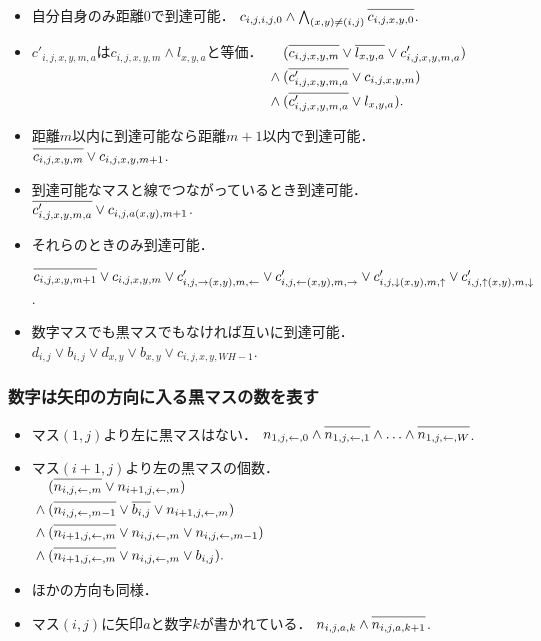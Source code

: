 \documentclass[a4j]{jarticle}
\newcommand{\N}[1]{\overline{#1\vphantom{l}}}
\newcommand{\←}{{\leftarrow}}
\newcommand{\→}{{\rightarrow}}
\newcommand{\↑}{{\uparrow}}
\newcommand{\↓}{{\downarrow}}
\begin{document}
\begin{itemize}
\item 自分自身のみ距離0で到達可能．
  $c_{i,j,i,j,0}\land \bigwedge_{(x,y)\ne(i,j)} \N{c_{i,j,x,y,0}}$.

\item $c'_{i,j,x,y,m,a}$は$c_{i,j,x,y,m}\land l_{x,y,a}$と等価．
  \quad
  $\begin{aligned}[t]
   &(\N{c_{i,j,x,y,m}}\lor\N{l_{x,y,a}}\lor{c'_{i,j,x,y,m,a}})\\{}\land{}
   &(\N{c'_{i,j,x,y,m,a}}\lor{c_{i,j,x,y,m}})\\{}\land{}
   &(\N{c'_{i,j,x,y,m,a}}\lor{l_{x,y,a}}).
   \end{aligned}$

\item 距離$m$以内に到達可能なら距離$m+1$以内で到達可能．
   $\N{c_{i,j,x,y,m}}\lor c_{i,j,x,y,m+1}$.
\item 到達可能なマスと線でつながっているとき到達可能．
   $\N{c'_{i,j,x,y,m,a}}\lor{c_{i,j,a(x,y),m+1}}$.
\item それらのときのみ到達可能．
   \par\qquad
     $\N{c_{i,j,x,y,m+1}}\lor
      c_{i,j,x,y,m}\lor
      c'_{i,j,\→(x,y),m,\←}\lor
      c'_{i,j,\←(x,y),m,\→}\lor
      c'_{i,j,\↓(x,y),m,\↑}\lor
      c'_{i,j,\↑(x,y),m,\↓}$.

\item 数字マスでも黒マスでもなければ互いに到達可能．
  $d_{i,j}\lor b_{i,j}\lor
   d_{x,y}\lor b_{x,y}\lor
   c_{i,j,x,y,WH-1}$.
\end{itemize}

\subsubsection{数字は矢印の方向に入る黒マスの数を表す}

\begin{itemize}
\item マス$(1,j)$より左に黒マスはない．
$n_{1,j,\←,0}
\land \N{n_{1,j,\←,1}} \land\ldots\land \N{n_{1,j,\←,W}}$.

\item マス$(i+1,j)$より左の黒マスの個数．
  $\begin{aligned}[t]
   &(\N{n_{i,j,\←,m}}\lor n_{i+1,j,\←,m})\\{}\land{}
   &(\N{n_{i,j,\←,m-1}}\lor\N{b_{i,j}}\lor n_{i+1,j,\←,m})\\{}\land{}
   &(\N{n_{i+1,j,\←,m}}\lor n_{i,j,\←,m}\lor n_{i,j,\←,m-1})\\
   {}\land{}
   &(\N{n_{i+1,j,\←,m}}\lor n_{i,j,\←,m}\lor b_{i,j}).
   \end{aligned}$

\item ほかの方向も同様．

\item マス$(i,j)$に矢印$a$と数字$k$が書かれている．
  $n_{i,j,a,k}\land\N{n_{i,j,a,k+1}}$.
\end{itemize}
\end{document}
